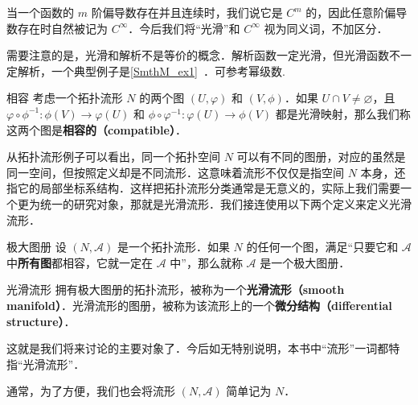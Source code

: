 当一个函数的 $m$ 阶偏导数存在并且连续时，我们说它是 $C^m$ 的，因此任意阶偏导数存在时自然被记为 $C^\infty$．今后我们将“光滑”和 $C^\infty$ 视为同义词，不加区分．

需要注意的是，光滑和解析不是等价的概念．解析函数一定光滑，但光滑函数不一定解析，一个典型例子是\autoref{SmthM_ex1}~．可参考幂级数.

\begin{definition}{相容}
考虑一个拓扑流形 $N$ 的两个图 $(U, \varphi)$ 和 $(V, \phi)$．如果 $U\cap V\not=\varnothing$，且 $\varphi\circ\phi^{-1}:\phi(V)\rightarrow\varphi(U)$ 和 $\phi\circ\varphi^{-1}:\varphi(U)\rightarrow\phi(V)$ 都是光滑映射，那么我们称这两个图是\textbf{相容的（compatible）}．
\end{definition}

从拓扑流形例子可以看出，同一个拓扑空间 $N$ 可以有不同的图册，对应的虽然是同一空间，但按照定义却是不同流形．这意味着流形不仅仅是指空间 $N$ 本身，还指它的局部坐标系结构．这样把拓扑流形分类通常是无意义的，实际上我们需要一个更为统一的研究对象，那就是光滑流形．我们接连使用以下两个定义来定义光滑流形．

\begin{definition}{极大图册}
设 $(N, \mathcal{A})$ 是一个拓扑流形．如果 $N$ 的任何一个图，满足“只要它和 $\mathcal{A}$ 中\textbf{所有图}都相容，它就一定在 $\mathcal{A}$ 中”，那么就称 $\mathcal{A}$ 是一个极大图册．
\end{definition}

\begin{definition}{光滑流形}\label{Manif_def3}
拥有极大图册的拓扑流形，被称为一个\textbf{光滑流形（smooth manifold）}．光滑流形的图册，被称为该流形上的一个\textbf{微分结构（differential structure）}．
\end{definition}


这就是我们将来讨论的主要对象了．今后如无特别说明，本书中“流形”一词都特指“光滑流形”．

通常，为了方便，我们也会将流形 $(N, \mathcal{A})$ 简单记为 $N$．






